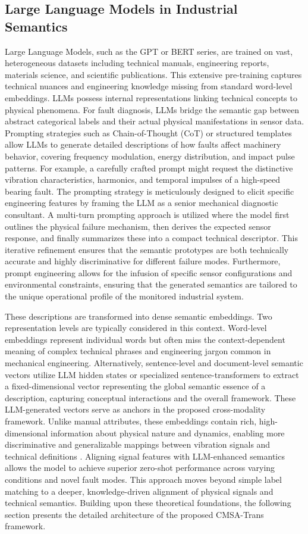 \subsection{Large Language Models in Industrial Semantics}
Large Language Models, such as the GPT or BERT series, are trained on vast, heterogeneous datasets including technical manuals, engineering reports, materials science, and scientific publications. This extensive pre-training captures technical nuances and engineering knowledge missing from standard word-level embeddings. LLMs possess internal representations linking technical concepts to physical phenomena. For fault diagnosis, LLMs bridge the semantic gap between abstract categorical labels and their actual physical manifestations in sensor data. Prompting strategies such as Chain-of-Thought (CoT) or structured templates allow LLMs to generate detailed descriptions of how faults affect machinery behavior, covering frequency modulation, energy distribution, and impact pulse patterns. For example, a carefully crafted prompt might request the distinctive vibration characteristics, harmonics, and temporal impulses of a high-speed bearing fault. The prompting strategy is meticulously designed to elicit specific engineering features by framing the LLM as a senior mechanical diagnostic consultant. A multi-turn prompting approach is utilized where the model first outlines the physical failure mechanism, then derives the expected sensor response, and finally summarizes these into a compact technical descriptor. This iterative refinement ensures that the semantic prototypes are both technically accurate and highly discriminative for different failure modes. Furthermore, prompt engineering allows for the infusion of specific sensor configurations and environmental constraints, ensuring that the generated semantics are tailored to the unique operational profile of the monitored industrial system.

These descriptions are transformed into dense semantic embeddings. Two representation levels are typically considered in this context. Word-level embeddings represent individual words but often miss the context-dependent meaning of complex technical phrases and engineering jargon common in mechanical engineering. Alternatively, sentence-level and document-level semantic vectors utilize LLM hidden states or specialized sentence-transformers to extract a fixed-dimensional vector representing the global semantic essence of a description, capturing conceptual interactions and the overall framework. These LLM-generated vectors serve as anchors in the proposed cross-modality framework. Unlike manual attributes, these embeddings contain rich, high-dimensional information about physical nature and dynamics, enabling more discriminative and generalizable mappings between vibration signals and technical definitions \cite{brown2020language, devlin2018bert, li2024industrial}. Aligning signal features with LLM-enhanced semantics allows the model to achieve superior zero-shot performance across varying conditions and novel fault modes. This approach moves beyond simple label matching to a deeper, knowledge-driven alignment of physical signals and technical semantics. Building upon these theoretical foundations, the following section presents the detailed architecture of the proposed CMSA-Trans framework.
